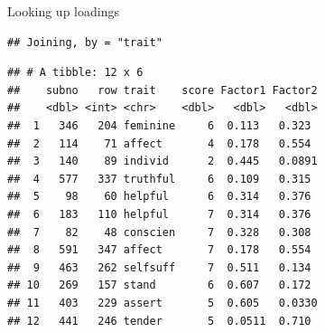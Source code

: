 \documentclass[ignorenonframetext,]{beamer}
\newenvironment{Shaded}{\begin{snugshade}}{\end{snugshade}}
\newcommand{\DecValTok}[1]{\textcolor[rgb]{0.00,0.00,0.81}{#1}}
\newcommand{\KeywordTok}[1]{\textcolor[rgb]{0.13,0.29,0.53}{\textbf{#1}}}
\newcommand{\NormalTok}[1]{#1}
\newcommand{\OperatorTok}[1]{\textcolor[rgb]{0.81,0.36,0.00}{\textbf{#1}}}
\newcommand{\StringTok}[1]{\textcolor[rgb]{0.31,0.60,0.02}{#1}}
\begin{document}
\begin{frame}[fragile]{Looking up loadings}
\protect\hypertarget{looking-up-loadings}{}

\scriptsize

\begin{Shaded}
\end{Shaded}

\begin{verbatim}
## Joining, by = "trait"
\end{verbatim}

\begin{Shaded}
\end{Shaded}

\begin{verbatim}
## # A tibble: 12 x 6
##    subno   row trait    score Factor1 Factor2
##    <dbl> <int> <chr>    <dbl>   <dbl>   <dbl>
##  1   346   204 feminine     6  0.113   0.323 
##  2   114    71 affect       4  0.178   0.554 
##  3   140    89 individ      2  0.445   0.0891
##  4   577   337 truthful     6  0.109   0.315 
##  5    98    60 helpful      6  0.314   0.376 
##  6   183   110 helpful      7  0.314   0.376 
##  7    82    48 conscien     7  0.328   0.308 
##  8   591   347 affect       7  0.178   0.554 
##  9   463   262 selfsuff     7  0.511   0.134 
## 10   269   157 stand        6  0.607   0.172 
## 11   403   229 assert       5  0.605   0.0330
## 12   441   246 tender       5  0.0511  0.710
\end{verbatim}

\normalsize

\end{frame}
\end{document}
